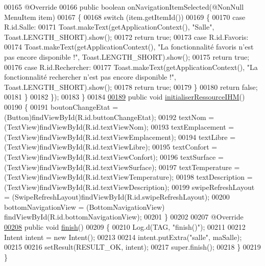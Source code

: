 \begin{DoxyCode}
00165             @Override
00166             \textcolor{keyword}{public} \textcolor{keywordtype}{boolean} onNavigationItemSelected(@NonNull MenuItem item)
00167             \{
00168                 \textcolor{keywordflow}{switch} (item.getItemId())
00169                 \{
00170                     \textcolor{keywordflow}{case} R.id.Salle:
00171                         Toast.makeText(getApplicationContext(), \textcolor{stringliteral}{"Salle"}, Toast.LENGTH\_SHORT).show();
00172                         \textcolor{keywordflow}{return} \textcolor{keyword}{true};
00173                     \textcolor{keywordflow}{case} R.id.Favoris:
00174                         Toast.makeText(getApplicationContext(), \textcolor{stringliteral}{"La fonctionnalité favoris n'est pas encore
       disponible !"}, Toast.LENGTH\_SHORT).show();
00175                         \textcolor{keywordflow}{return} \textcolor{keyword}{true};
00176                     \textcolor{keywordflow}{case} R.id.Rechercher:
00177                         Toast.makeText(getApplicationContext(), \textcolor{stringliteral}{"La fonctionnalité rechercher n'est pas
       encore disponible !"}, Toast.LENGTH\_SHORT).show();
00178                         \textcolor{keywordflow}{return} \textcolor{keyword}{true};
00179                 \}
00180                 \textcolor{keywordflow}{return} \textcolor{keyword}{false};
00181             \}
00182         \});
00183     \}
00184 
\hyperlink{classcom_1_1lasalle_1_1meeting_1_1_salle_activity_af41d9cf11c5032e1c44b7e8f08b8211a}{00189}     \textcolor{keyword}{public} \textcolor{keywordtype}{void} \hyperlink{classcom_1_1lasalle_1_1meeting_1_1_salle_activity_af41d9cf11c5032e1c44b7e8f08b8211a}{initialiserRessourceIHM}()
00190     \{
00191         boutonChangeEtat = (Button)findViewById(R.id.buttonChangeEtat);
00192         textNom = (TextView)findViewById(R.id.textViewNom);
00193         textEmplacement = (TextView)findViewById(R.id.textViewEmplacement);
00194         textLibre = (TextView)findViewById(R.id.textViewLibre);
00195         textConfort = (TextView)findViewById(R.id.textViewConfort);
00196         textSurface = (TextView)findViewById(R.id.textViewSurface);
00197         textTemperature = (TextView)findViewById(R.id.textViewTemperature);
00198         textDescription = (TextView)findViewById(R.id.textViewDescription);
00199         swipeRefreshLayout = (SwipeRefreshLayout)findViewById(R.id.swipeRefreshLayout);
00200         bottomNavigationView = (BottomNavigationView) findViewById(R.id.bottomNavigationView);
00201     \}
00202 
00207     @Override
\hyperlink{classcom_1_1lasalle_1_1meeting_1_1_salle_activity_a26628d1f78ddcfaff36b33d354cd97b9}{00208}     \textcolor{keyword}{public} \textcolor{keywordtype}{void} \hyperlink{classcom_1_1lasalle_1_1meeting_1_1_salle_activity_a26628d1f78ddcfaff36b33d354cd97b9}{finish}()
00209     \{
00210         Log.d(TAG, \textcolor{stringliteral}{"finish()"});
00211 
00212         Intent intent = \textcolor{keyword}{new} Intent();
00213 
00214         intent.putExtra(\textcolor{stringliteral}{"salle"}, maSalle);
00215 
00216         setResult(RESULT\_OK, intent);
00217         super.finish();
00218     \}
00219 \}
\end{DoxyCode}

